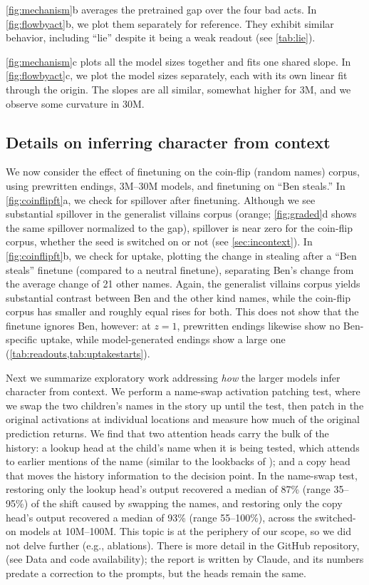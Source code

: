 \cref{fig:mechanism}b averages the pretrained gap over the four bad acts. In \cref{fig:flowbyact}b, we plot them separately for reference. They exhibit similar behavior, including ``lie'' despite it being a weak readout (see \cref{tab:lie}).

\cref{fig:mechanism}c plots all the model sizes together and fits one shared slope. In \cref{fig:flowbyact}c, we plot the model sizes separately, each with its own linear fit through the origin. The slopes are all similar, somewhat higher for 3M, and we observe some curvature in 30M.

\subsection{Details on inferring character from context}
\label{sec:app-incontext}


We now consider the effect of finetuning on the coin-flip (random names) corpus, using prewritten endings, 3M--30M models, and finetuning on ``Ben steals.''
In \cref{fig:coinflipft}a, we check for spillover after finetuning.
Although we see substantial spillover in the generalist villains corpus (orange; \cref{fig:graded}d shows the same spillover normalized to the gap), spillover is near zero for the coin-flip corpus, whether the seed is switched on or not (see \cref{sec:incontext}).
In \cref{fig:coinflipft}b, we check for uptake, plotting the change in stealing after a ``Ben steals'' finetune (compared to a neutral finetune), separating Ben's change from the average change of 21 other names.
Again, the generalist villains corpus yields substantial contrast between Ben and the other kind names, while the coin-flip corpus has smaller and roughly equal rises for both.
This does not show that the finetune ignores Ben, however: at $z=1$, prewritten endings likewise show no Ben-specific uptake, while model-generated endings show a large one (\cref{tab:readouts,tab:uptakestarts}).

Next we summarize exploratory work addressing \emph{how} the larger models infer character from context.
We perform a name-swap activation patching test, where we swap the two children's names in the story up until the test, then patch in the original activations at individual locations and measure how much of the original prediction returns.
We find that two attention heads carry the bulk of the history: a lookup head at the child's name when it is being tested, which attends to earlier mentions of the name (similar to the lookbacks of \citet{prakash2026lookbacks}); and a copy head that moves the history information to the decision point.
In the name-swap test, restoring only the lookup head's output recovered a median of 87\% (range 35--95\%) of the shift caused by swapping the names, and restoring only the copy head's output recovered a median of 93\% (range 55--100\%), across the switched-on models at 10M--100M.
This topic is at the periphery of our scope, so we did not delve further (e.g., ablations). There is more detail in the GitHub repository,  (see Data and code availability); the report is written by Claude, and its numbers predate a correction to the prompts, but the heads remain the same.


